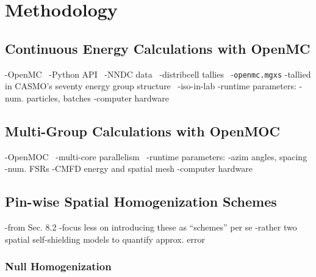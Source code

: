 \section{Methodology}
\label{sec:methodology}

\subsection{Continuous Energy Calculations with OpenMC}
\label{subsec:openmc}

-OpenMC~\cite{romano2013openmc}
-Python API~\cite{boyd2016bigdata}
-NNDC data~\cite{nndc2016endf}
-distribcell tallies~\cite{lax2014distribcell}
-\texttt{openmc.mgxs}
  -tallied in CASMO's seventy energy group structure~\cite{rhodes2006casmo}
-iso-in-lab
-runtime parameters:
  -num. particles, batches
  -computer hardware

\subsection{Multi-Group Calculations with OpenMOC}
\label{subsec:openmoc}

-OpenMOC~\cite{boyd2014openmoc}
-multi-core parallelism~\cite{boyd2016parallel}
-runtime parameters:
  -azim angles, spacing
  -num. FSRs
  -CMFD energy and spatial mesh
  -computer hardware


\subsection{Pin-wise Spatial Homogenization Schemes}
\label{subsec:homogenize}

-from Sec. 8.2
-focus less on introducing these as ``schemes'' per se
  -rather two spatial self-shielding models to quantify approx. error

\subsubsection{Null Homogenization}
\label{subsubsec:homogenize-null}

